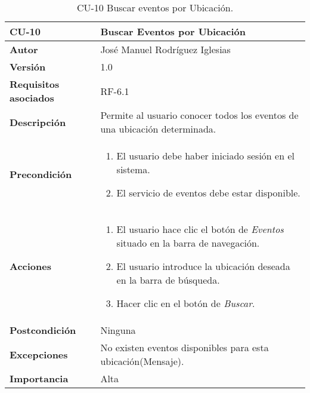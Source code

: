\begin{table}[h]
	\centering
	\begin{tabularx}{\linewidth}{ p{} p{} }
		\toprule
		\textbf{CU-10}    & \textbf{Buscar Eventos por Ubicación}\\
		\toprule
            \textbf{Autor}                & José Manuel Rodríguez Iglesias \\
		\textbf{Versión}              & 1.0    \\
		\textbf{Requisitos asociados} & RF-6.1 \\
		\textbf{Descripción}          & Permite al usuario conocer todos los eventos de una ubicación determinada. \\
		\textbf{Precondición}         &  
            \begin{enumerate}
			\def\labelenumi{\arabic{enumi}.}
			\tightlist
			\item El usuario debe haber iniciado sesión en el sistema.
			\item El servicio de eventos debe estar disponible.
		\end{enumerate}\\
    
  
		\textbf{Acciones}             &
		\begin{enumerate}
			\def\labelenumi{\arabic{enumi}.}
			\tightlist
                \item El usuario hace clic el botón de\textit{ Eventos} situado en la barra de navegación.
			\item El usuario introduce la ubicación deseada en la barra de búsqueda. 
                \item Hacer clic en el botón de \textit{Buscar}.
		\end{enumerate}\\
		\textbf{Postcondición}        & Ninguna \\
		\textbf{Excepciones}          & No existen eventos disponibles para esta ubicación(Mensaje). \\
		\textbf{Importancia}          & Alta\\
		\bottomrule
	\end{tabularx}
	\caption{CU-10 Buscar eventos por Ubicación.}
\end{table}

